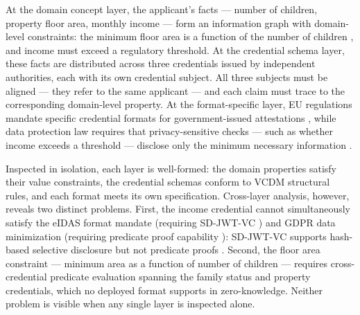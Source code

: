 
At the domain concept layer, the applicant's facts --- number of children, property floor area, monthly income --- form an information graph with domain-level constraints: the minimum floor area is a function of the number of children , and income must exceed a regulatory threshold. At the credential schema layer, these facts are distributed across three credentials issued by independent authorities, each with its own credential subject. All three subjects must be aligned --- they refer to the same applicant --- and each claim must trace to the corresponding domain-level property. At the format-specific layer, EU regulations mandate specific credential formats for government-issued attestations , while data protection law requires that privacy-sensitive checks --- such as whether income exceeds a threshold --- disclose only the minimum necessary information .



Inspected in isolation, each layer is well-formed: the domain properties satisfy their value constraints, the credential schemas conform to VCDM structural rules, and each format meets its own specification. Cross-layer analysis, however, reveals two distinct problems. First, the income credential cannot simultaneously satisfy the eIDAS format mandate (requiring SD-JWT-VC ) and GDPR data minimization (requiring predicate proof capability ): SD-JWT-VC supports hash-based selective disclosure but not predicate proofs . Second, the floor area constraint --- minimum area as a function of number of children --- requires cross-credential predicate evaluation spanning the family status and property credentials, which no deployed format supports in zero-knowledge. Neither problem is visible when any single layer is inspected alone.

